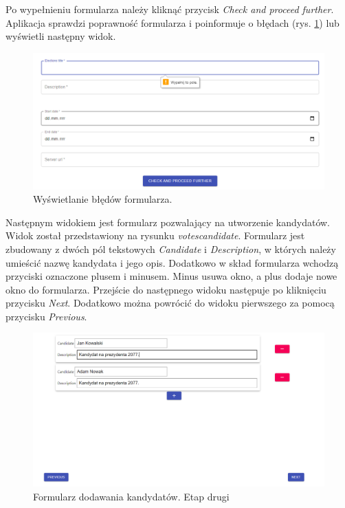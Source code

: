 \documentclass[a4paper,12pt]{book}
\begin{document}
Po wypełnieniu formularza należy kliknąć przycisk \textit{Check and proceed further}. Aplikacja sprawdzi poprawność formularza i poinformuje o błędach (rys. \ref{votesconfigerror}) lub wyświetli następny widok.

\begin{figure}[h]
	\centering
	\includegraphics[width=\textwidth]{images/votesconfigerror.png}
	\caption{Wyświetlanie błędów formularza.}\label{votesconfigerror}
\end {figure}

Następnym widokiem jest formularz pozwalający na utworzenie kandydatów. Widok został przedstawiony na rysunku \textit{votescandidate}. Formularz jest zbudowany z dwóch pól tekstowych \textit{Candidate} i \textit{Description}, w których należy umieścić nazwę kandydata i jego opis. Dodatkowo w skład formularza wchodzą przyciski oznaczone plusem i minusem. Minus usuwa okno, a plus dodaje nowe okno do formularza. Przejście do następnego widoku następuje po kliknięciu przycisku \textit{Next}. Dodatkowo można powrócić do widoku pierwszego za pomocą przycisku \textit{Previous}.
\newpage

\begin{figure}[h]
	\centering
	\includegraphics[width=\textwidth]{images/votescandidate.png}
	\caption{Formularz dodawania kandydatów. Etap drugi}\label{votescandidate}
\end {figure}
\end{document}
